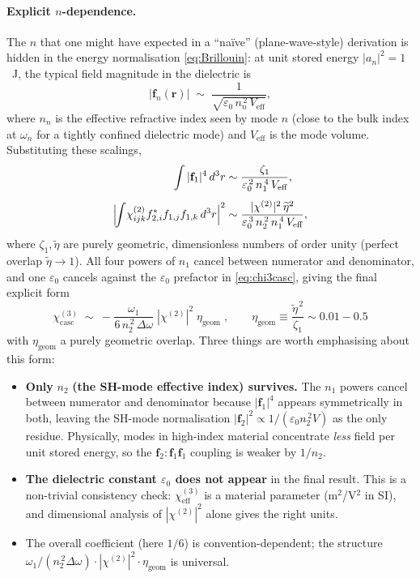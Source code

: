 \documentclass[11pt,a4paper]{article}
\newcommand{\eps}{\varepsilon}
\newcommand{\bvec}[1]{\mathbf{#1}}
\newcommand{\f}{\bvec{f}}
\newcommand{\ri}{\bvec{r}}
\newcommand{\dthreer}{\,d^{3}r}
\newcommand{\chitwo}{\chi^{(2)}}
\newcommand{\chithree}{\chi^{(3)}}
\newcommand{\Dom}{\Delta\omega}
\begin{document}
\paragraph{Explicit $n$-dependence.}
The $n$ that one might have expected in a ``naïve'' (plane-wave-style)
derivation is hidden in the energy normalisation
\eqref{eq:Brillouin}: at unit stored energy $|a_n|^2=1$~J, the typical
field magnitude in the dielectric is
\begin{equation}
  |\f_n(\ri)|\;\sim\;\frac{1}{\sqrt{\eps_0\,n_n^{\,2}\,V_\text{eff}}},
\end{equation}
where $n_n$ is the effective refractive index seen by mode $n$ (close
to the bulk index at $\omega_n$ for a tightly confined dielectric mode)
and $V_\text{eff}$ is the mode volume.  Substituting these scalings,
\begin{align}
  \int|\f_1|^4\dthreer&\sim\frac{\zeta_1}{\eps_0^{\,2}\,n_1^{\,4}\,V_\text{eff}},
  \\[4pt]
  \Bigl|\!\int\!\chitwo_{ijk}f_{2,i}^*f_{1,j}f_{1,k}\dthreer\Bigr|^{2}
        &\sim\frac{|\chitwo|^{2}\,\widetilde\eta^{2}}{\eps_0^{\,3}\,n_2^{\,2}\,n_1^{\,4}\,V_\text{eff}},
\end{align}
where $\zeta_1,\widetilde\eta$ are purely geometric, dimensionless numbers of
order unity (perfect overlap $\widetilde\eta\to 1$).  All four powers of
$n_1$ cancel between numerator and denominator, and one $\eps_0$
cancels against the $\eps_0$ prefactor in \eqref{eq:chi3casc}, giving
the final explicit form
\begin{equation}
  \boxed{\;\chithree_{\text{casc}}\;\sim\;-\frac{\omega_1}{6\,n_2^{\,2}\,\Dom}\;|\chitwo|^{2}\;\eta_\text{geom}\;,
        \qquad \eta_\text{geom}\equiv\frac{\widetilde\eta^{\,2}}{\zeta_1}\sim 0.01\!-\!0.5\;}
\label{eq:chi3casc_explicit}
\end{equation}
with $\eta_\text{geom}$ a purely geometric overlap.  Three things are
worth emphasising about this form:
\begin{itemize}
  \item \textbf{Only} $n_2$ \textbf{(the SH-mode effective index) survives.}
        The $n_1$ powers cancel between numerator and denominator
        because $|\f_1|^4$ appears symmetrically in both, leaving the
        SH-mode normalisation $|\f_2|^2\propto 1/(\eps_0 n_2^{\,2}V)$
        as the only residue.  Physically, modes in high-index material
        concentrate \emph{less} field per unit stored energy, so the
        $\f_2{:}\f_1\f_1$ coupling is weaker by $1/n_2$.
  \item \textbf{The dielectric constant $\eps_0$ does not appear} in the
        final result.  This is a non-trivial consistency check: $\chi^{(3)}_\text{eff}$
        is a material parameter (m$^2$/V$^2$ in SI), and dimensional
        analysis of $|\chitwo|^{2}$ alone gives the right units.
  \item The overall coefficient (here $1/6$) is convention-dependent;
        the structure $\omega_1/(n_2^{\,2}\Dom)\cdot|\chitwo|^{2}\cdot\eta_\text{geom}$
        is universal.
\end{itemize}
\end{document}
